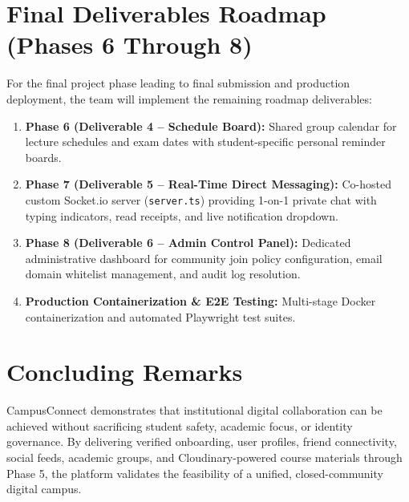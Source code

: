 \documentclass[12pt, a4paper, oneside]{report}
\begin{document}
\section{Final Deliverables Roadmap (Phases 6 Through 8)}
For the final project phase leading to final submission and production deployment, the team will implement the remaining roadmap deliverables:
\begin{enumerate}[leftmargin=0.7cm]
    \item \textbf{Phase 6 (Deliverable 4 -- Schedule Board):} Shared group calendar for lecture schedules and exam dates with student-specific personal reminder boards.
    \item \textbf{Phase 7 (Deliverable 5 -- Real-Time Direct Messaging):} Co-hosted custom Socket.io server (\texttt{server.ts}) providing 1-on-1 private chat with typing indicators, read receipts, and live notification dropdown.
    \item \textbf{Phase 8 (Deliverable 6 -- Admin Control Panel):} Dedicated administrative dashboard for community join policy configuration, email domain whitelist management, and audit log resolution.
    \item \textbf{Production Containerization \& E2E Testing:} Multi-stage Docker containerization and automated Playwright test suites.
\end{enumerate}

\section{Concluding Remarks}
CampusConnect demonstrates that institutional digital collaboration can be achieved without sacrificing student safety, academic focus, or identity governance. By delivering verified onboarding, user profiles, friend connectivity, social feeds, academic groups, and Cloudinary-powered course materials through Phase 5, the platform validates the feasibility of a unified, closed-community digital campus.
\end{document}
